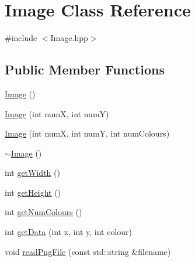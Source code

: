 \hypertarget{class_image}{\section{Image Class Reference}
\label{class_image}
}


{\ttfamily \#include $<$Image.\-hpp$>$}

\subsection*{Public Member Functions}
\begin{DoxyCompactItemize}
\item 
\hyperlink{class_image_a58edd1c45b4faeb5f789b0d036d02313}{Image} ()
\item 
\hyperlink{class_image_a57fc741dbb4f5535564cecc08b48fbdc}{Image} (int num\-X, int num\-Y)
\item 
\hyperlink{class_image_afb1678cfc99d6e049769dec2ddff7e89}{Image} (int num\-X, int num\-Y, int num\-Colours)
\item 
\hyperlink{class_image_a0294f63700543e11c0f0da85601c7ae5}{$\sim$\-Image} ()
\item 
int \hyperlink{class_image_af2720a072812763395512fc3c8c21362}{get\-Width} ()
\item 
int \hyperlink{class_image_aa4e1f064e5e1f3f04ad605408f1ec3af}{get\-Height} ()
\item 
int \hyperlink{class_image_a8313a877af2a774dda00f99e4f2ff2d0}{get\-Num\-Colours} ()
\item 
int \hyperlink{class_image_a7e0accd8358ef5dc43d24f2f90941ced}{get\-Data} (int x, int y, int colour)
\item 
void \hyperlink{class_image_a3c6d45a4014645eafb25e09e3685f144}{read\-Png\-File} (const std\-::string \&filename)
\end{DoxyCompactItemize}


